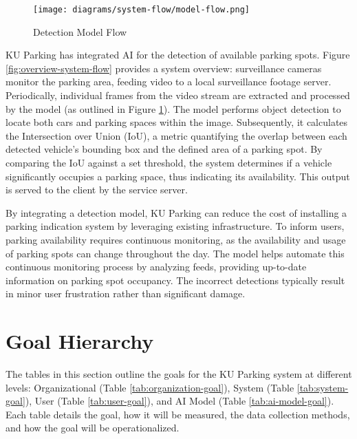 \begin{figure}[H]
    \centering
    \texttt{[image: diagrams/system-flow/model-flow.png]}
    \caption{Detection Model Flow}
    \label{fig:model-flow}
\end{figure}


KU Parking has integrated AI for the detection of available parking spots. Figure \ref{fig:overview-system-flow} provides a system overview: surveillance cameras monitor the parking area, feeding video to a local surveillance footage server. Periodically, individual frames from the video stream are extracted and processed by the model (as outlined in Figure \ref{fig:model-flow}). The model performs object detection to locate both cars and parking spaces within the image. Subsequently, it calculates the Intersection over Union (IoU), a metric quantifying the overlap between each detected vehicle's bounding box and the defined area of a parking spot. By comparing the IoU against a set threshold, the system determines if a vehicle significantly occupies a parking space, thus indicating its availability. This output is served to the client by the service server.

By integrating a detection model, KU Parking can reduce the cost of installing a parking indication system by leveraging existing infrastructure. To inform users, parking availability requires continuous monitoring, as the availability and usage of parking spots can change throughout the day. The model helps automate this continuous monitoring process by analyzing feeds, providing up-to-date information on parking spot occupancy. The incorrect detections typically result in minor user frustration rather than significant damage.

\section{Goal Hierarchy}
\label{section:goal-hierarchy}

The tables in this section outline the goals for the KU Parking system at different levels: Organizational (Table \ref{tab:organization-goal}), System (Table \ref{tab:system-goal}), User (Table \ref{tab:user-goal}), and AI Model (Table \ref{tab:ai-model-goal}). Each table details the goal, how it will be measured, the data collection methods, and how the goal will be operationalized.

